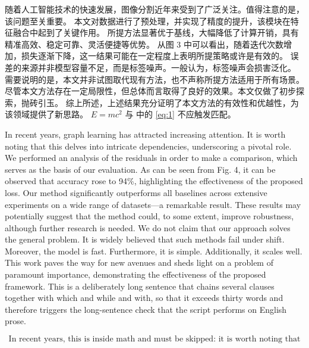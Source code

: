 随着人工智能技术的快速发展，图像分割近年来受到了广泛关注。值得注意的是，该问题至关重要。
本文对数据进行了预处理，并实现了精度的提升，该模块在特征融合中起到了关键作用。
所提方法显著优于基线，大幅降低了计算开销，具有精准高效、稳定可靠、灵活便捷等优势。
从图 3 中可以看出，随着迭代次数增加，损失逐渐下降，这一结果可能在一定程度上表明所提策略或许是有效的。
误差的来源并非模型容量不足，而是标签噪声。一般认为，标签噪声会损害泛化。
需要说明的是，本文并非试图取代现有方法，也不声称所提方法适用于所有场景。
尽管本文方法存在一定局限性，但总体而言取得了良好的效果。本文仅做了初步探索，抛砖引玉。
综上所述，上述结果充分证明了本文方法的有效性和优越性，为该领域提供了新思路。
$E = mc^2$ 与 \cite{smith2020} 中的 \ref{eq:1} 不应触发匹配。

In recent years, graph learning has attracted increasing attention. It is worth noting that this delves into intricate dependencies, underscoring a pivotal role.
We performed an analysis of the residuals in order to make a comparison, which serves as the basis of our evaluation.
As can be seen from Fig. 4, it can be observed that accuracy rose to 94\%, highlighting the effectiveness of the proposed loss.
Our method significantly outperforms all baselines across extensive experiments on a wide range of datasets---a remarkable result.
These results may potentially suggest that the method could, to some extent, improve robustness, although further research is needed.
We do not claim that our approach solves the general problem. It is widely believed that such methods fail under shift.
Moreover, the model is fast. Furthermore, it is simple. Additionally, it scales well.
This work paves the way for new avenues and sheds light on a problem of paramount importance, demonstrating the effectiveness of the proposed framework.
This is a deliberately long sentence that chains several clauses together with which and while and with, so that it exceeds thirty words and therefore triggers the long-sentence check that the script performs on English prose.

\begin{equation}
  \text{In recent years, this is inside math and must be skipped: it is worth noting that}
\end{equation}
